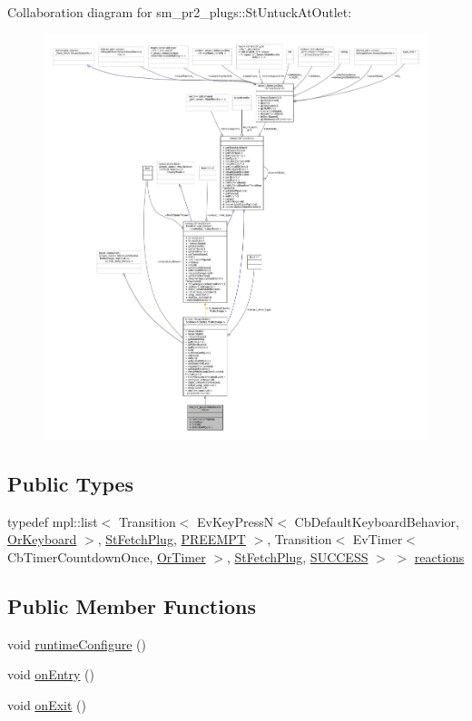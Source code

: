 Collaboration diagram for sm\+\_\+pr2\+\_\+plugs\+:\+:St\+Untuck\+At\+Outlet\+:
\nopagebreak
\begin{figure}[H]
\begin{center}
\leavevmode
\includegraphics[width=350pt]{structsm__pr2__plugs_1_1StUntuckAtOutlet__coll__graph}
\end{center}
\end{figure}
\subsection*{Public Types}
\begin{DoxyCompactItemize}
\item 
typedef mpl\+::list$<$ Transition$<$ Ev\+Key\+PressN$<$ Cb\+Default\+Keyboard\+Behavior, \hyperlink{classsm__pr2__plugs_1_1OrKeyboard}{Or\+Keyboard} $>$, \hyperlink{structsm__pr2__plugs_1_1StFetchPlug}{St\+Fetch\+Plug}, \hyperlink{classPREEMPT}{P\+R\+E\+E\+M\+PT} $>$, Transition$<$ Ev\+Timer$<$ Cb\+Timer\+Countdown\+Once, \hyperlink{classsm__pr2__plugs_1_1OrTimer}{Or\+Timer} $>$, \hyperlink{structsm__pr2__plugs_1_1StFetchPlug}{St\+Fetch\+Plug}, \hyperlink{classSUCCESS}{S\+U\+C\+C\+E\+SS} $>$ $>$ \hyperlink{structsm__pr2__plugs_1_1StUntuckAtOutlet_a77b0bad04ff5db4fc1a9b8557a435211}{reactions}
\end{DoxyCompactItemize}
\subsection*{Public Member Functions}
\begin{DoxyCompactItemize}
\item 
void \hyperlink{structsm__pr2__plugs_1_1StUntuckAtOutlet_a14d6ec782f8d78b6df0ef610508b0e9b}{runtime\+Configure} ()
\item 
void \hyperlink{structsm__pr2__plugs_1_1StUntuckAtOutlet_a2bcd6c779d08b2c60a185c5dd7788544}{on\+Entry} ()
\item 
void \hyperlink{structsm__pr2__plugs_1_1StUntuckAtOutlet_a3122380d31ec0ce1584b6f92659cd171}{on\+Exit} ()
\end{DoxyCompactItemize}
